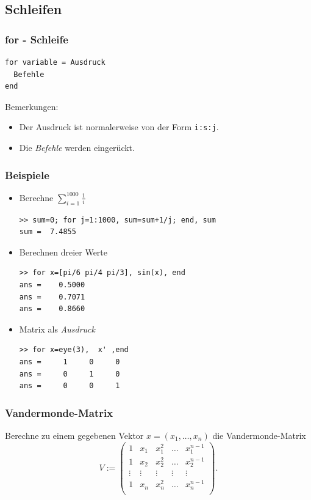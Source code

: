 \subsection{Schleifen}
%
%
\begin{frame}[fragile]\frametitle{for - Schleife}
\begin{lstlisting}
for variable = Ausdruck
  Befehle
end
\end{lstlisting}
\alert{Bemerkungen:} 
\begin{itemize}
\item Der Ausdruck ist normalerweise von der Form
\lstinline!i:s:j!. 
\item Die {\it Befehle} werden eingerückt. 
\end{itemize}
\end{frame}
%
%
\begin{frame}[fragile]\frametitle{Beispiele}
\begin{itemize}
\item Berechne $\sum_{i=1}^{1000} \frac{1}{i}$
\begin{lstlisting}
>> sum=0; for j=1:1000, sum=sum+1/j; end, sum
sum =  7.4855
\end{lstlisting}
\item Berechnen dreier Werte
\begin{lstlisting}
>> for x=[pi/6 pi/4 pi/3], sin(x), end
ans =    0.5000
ans =    0.7071
ans =    0.8660
\end{lstlisting}
\item Matrix als {\it Ausdruck}
\begin{lstlisting}
>> for x=eye(3),  x' ,end
ans =     1     0     0
ans =     0     1     0
ans =     0     0     1
\end{lstlisting}
\end{itemize}
\end{frame}
\begin{frame}[fragile]\frametitle{Vandermonde-Matrix }
Berechne zu einem gegebenen Vektor
  $x=(x_1, \dots ,x_n)$ die Vandermonde-Matrix
{ \[ V:= \left(\begin{array}{ccccc} 
1 & x_1 & x_1^2 & \hdots & x_1^{n-1}\\
1 & x_2 & x_2^2 & \hdots & x_2^{n-1}\\
\vdots & \vdots & \vdots & \vdots & \vdots\\
1 & x_n & x_n^2 & \hdots & x_n^{n-1}\\
\end{array} \right).  \]}
\end{frame}
%
%
%
